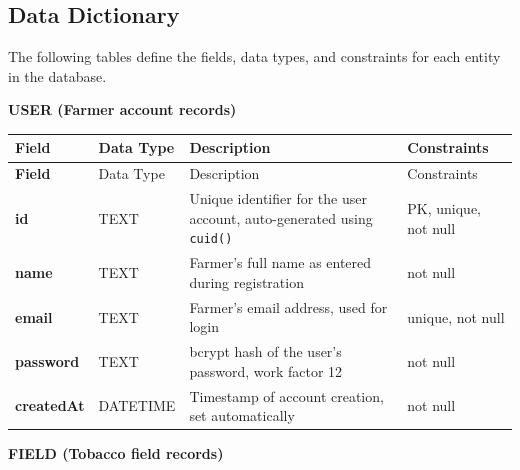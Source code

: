 \begin{figure}[H]
{%
}
\end{figure}

\subsection{Data Dictionary}

The following tables define the fields, data types, and constraints for each entity in the database.

\noindent\textbf{USER (Farmer account records)}

\begin{longtable}{>{\bfseries}p{3.0cm} p{2.2cm} p{5.5cm} p{2.5cm}}
\toprule
Field & Data Type & Description & Constraints \\
\midrule
\endfirsthead
\toprule
Field & Data Type & Description & Constraints \\
\midrule
\endhead
\bottomrule
\endfoot
id         & TEXT     & Unique identifier for the user account, auto-generated using \texttt{cuid()} & PK, unique, not null \\[3pt]
name       & TEXT     & Farmer's full name as entered during registration & not null \\[3pt]
email      & TEXT     & Farmer's email address, used for login & unique, not null \\[3pt]
password   & TEXT     & bcrypt hash of the user's password, work factor 12 & not null \\[3pt]
createdAt  & DATETIME & Timestamp of account creation, set automatically & not null \\[3pt]
\end{longtable}

\vspace{0.5em}
\noindent\textbf{FIELD (Tobacco field records)}

